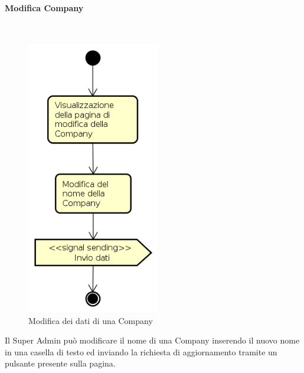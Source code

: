 \paragraph{Modifica Company} \mbox{} \\
\begin{figure}[H]
\begin{center}
\includegraphics[height=12cm]{res/sections/backend/activities/modificaCompanySA.png}
\caption{Modifica dei dati di una Company}
\end{center}
\end{figure}
Il Super Admin può modificare il nome di una Company inserendo il nuovo nome in una casella di testo ed inviando la richiesta di aggiornamento tramite un pulsante presente sulla pagina.
\newpage
